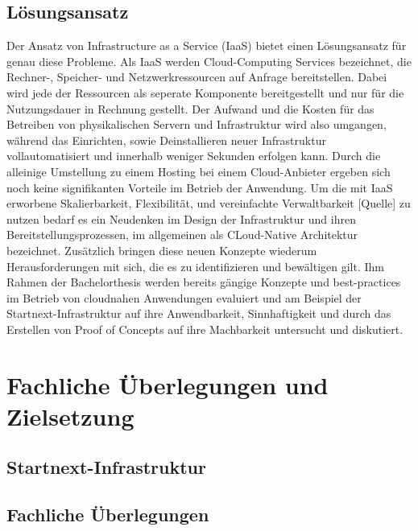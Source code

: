 \documentclass[11pt]{scrartcl}
\begin{document}
\subsection{Lösungsansatz}
Der Ansatz von Infrastructure as a Service (IaaS) bietet einen Lösungsansatz für genau diese Probleme.
Als IaaS werden Cloud-Computing Services bezeichnet, die Rechner-, Speicher- und Netzwerkressourcen auf Anfrage bereitstellen. Dabei wird jede der Ressourcen als seperate Komponente bereitgestellt und nur für die Nutzungsdauer in Rechnung gestellt. Der Aufwand und die Kosten für das Betreiben von physikalischen Servern und Infrastruktur wird also umgangen, während das Einrichten, sowie Deinstallieren neuer Infrastruktur vollautomatisiert und innerhalb weniger Sekunden erfolgen kann. Durch die alleinige Umstellung zu einem Hosting bei einem Cloud-Anbieter ergeben sich noch keine signifikanten Vorteile im Betrieb der Anwendung. Um die mit IaaS erworbene Skalierbarkeit, Flexibilität, und vereinfachte Verwaltbarkeit [Quelle] zu nutzen bedarf es ein Neudenken im Design der Infrastruktur und ihren Bereitstellungsprozessen, im allgemeinen als CLoud-Native Architektur bezeichnet. Zusätzlich bringen diese neuen Konzepte wiederum Herausforderungen mit sich, die es zu identifizieren und bewältigen gilt. \newline 
Ihm Rahmen der Bachelorthesis werden bereits g{\"a}ngige Konzepte und \glqq best-practices\grqq{} im Betrieb von cloudnahen Anwendungen evaluiert und am Beispiel der Startnext-Infrastruktur auf ihre Anwendbarkeit, Sinnhaftigkeit und durch das Erstellen von Proof of Concepts auf ihre Machbarkeit untersucht und diskutiert. 
\pagebreak


\section{\label{sec:fachliche_ueberlegungen} Fachliche Überlegungen und Zielsetzung}

\subsection{Startnext-Infrastruktur}

\subsection{Fachliche Überlegungen}
\end{document}
